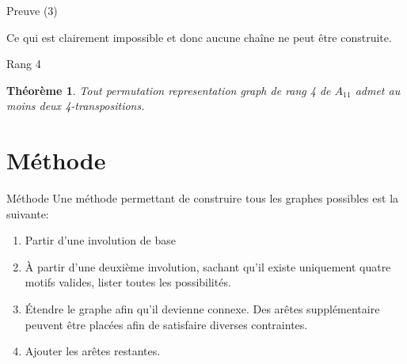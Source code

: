 \documentclass[10pt]{beamer}
\newtheorem{theorem}[definition]{Théorème}
\begin{document}
\begin{frame}{Preuve (3)}
\begin{figure}[H]
\begin{center}
    \end{center}
  \end{figure}

  Ce qui est clairement impossible et donc aucune chaîne ne peut être construite.

\end{frame}

\begin{frame}{Rang 4}
  \begin{theorem}
    Tout permutation representation graph de rang 4 de $A_{11}$ admet au moins deux 4-transpositions.
  \end{theorem}
\end{frame}

\section{Méthode}

\begin{frame}{Méthode}
  Une méthode permettant de construire tous les graphes possibles est la suivante:

  \begin{enumerate}
    \item Partir d'une involution de base
    \item À partir d'une deuxième involution, sachant qu'il existe uniquement quatre motifs valides, lister toutes les possibilités.
    \item Étendre le graphe afin qu'il devienne connexe. Des arêtes supplémentaire peuvent être placées afin de satisfaire diverses contraintes.
    \item Ajouter les arêtes restantes.
  \end{enumerate}
\end{frame}
\end{document}
